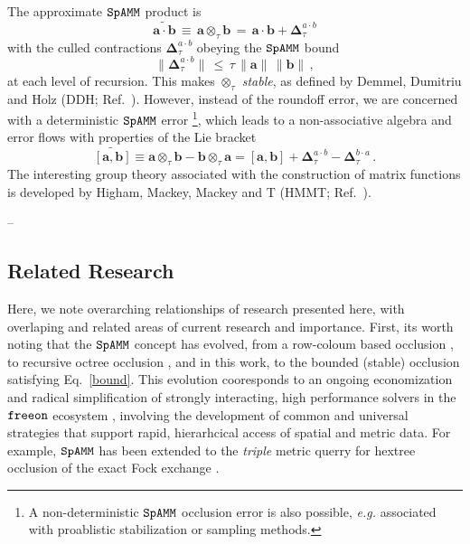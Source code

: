 \documentclass[letterpaper,twocolumn,amsmath,amsfont,amssymb,english,aps,jcp,preprintnumbers,groupaddress,nofootinbib,tightenlines]{revtex4}
\newcommand{\mat}[1]{\boldsymbol{#1}}
\newcommand{\ot}{ {\scriptstyle \otimes}_{ \tau } }
\begin{document}
The approximate $\tt SpAMM$ product is 
\begin{equation}
\widetilde{\mat{a}\cdot \mat{b}} \,  \equiv \, \mat{a} \ot \mat{b} \, 
  = \, \mat{a} \cdot \mat{b} + \mat{\Delta}^{a \cdot b}_{\tau} 
\end{equation}
with the culled contractions $\mat{\Delta}^{a \cdot b}_{\tau}$ obeying the $\tt SpAMM$ bound 
\begin{equation}\label{bound}
\lVert \mat{\Delta}^{a \cdot b}_{\tau} \rVert \, \leq \, \tau \, \lVert \mat{a} \rVert  \,  \lVert \mat{b} \rVert \, , 
\end{equation}
at each level of recursion.  This makes $\ot$ {\em stable}, as defined by Demmel, Dumitriu and Holz (DDH; Ref.~\cite{Demmel07}). 
However, instead of the roundoff error, we are concerned with a deterministic $\tt SpAMM$ error \footnote{A non-deterministic
${\tt SpAMM}$ occlusion error is also possible, {\em e.g.} associated with proablistic stabilization\cite{} or sampling\cite{} methods.},  which 
leads to a non-associative algebra and error flows with properties of the Lie bracket
\begin{equation}
\widetilde{\left[ \mat{a} , \mat{b} \right]} \equiv \mat{a} \ot \mat{b}-\mat{b} \ot \mat{a}  
=  \left[ \mat{a} , \mat{b} \right]
+ \mat{\Delta}^{a\cdot b}_{\tau} -\mat{\Delta}^{b\cdot a}_{\tau} \,.
\end{equation}
The interesting group theory associated with the construction of matrix functions is developed by Higham, Mackey, Mackey and T 
(HMMT; Ref.~\cite{}).  

\pagebreak
--
\pagebreak

\subsection{Related Research} 

Here, we note overarching relationships of research presented here,  with overlaping and related areas of current research and importance. 
First,  its worth noting that the $\tt SpAMM$ concept has evolved, 
from a row-coloum based occlusion \cite{}, to recursive octree occlusion \cite{}, and in this work, to the
bounded (stable) occlusion satisfying Eq.~\ref{bound}.    This evolution cooresponds to an  ongoing economization and radical simplification
of strongly interacting,  high performance solvers in the $\tt freeon$ ecosystem \cite{}, involving the development of 
common and universal strategies that support rapid, hierarhcical access of spatial and metric data.  
For example, $\tt SpAMM$ has been extended to the {\em triple} metric querry for hextree occlusion of 
the exact Fock exchange \cite{}.  
\end{document}
